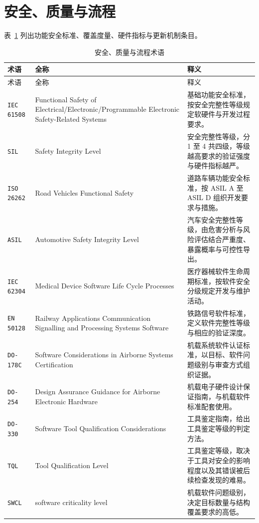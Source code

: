 \documentclass[12pt,a4paper,fontset=fandol]{ctexbook}
\newcommand{\Tp}[1]{\texttt{#1}}
\newcommand{\Bk}{\discretionary{}{}{}}
\begin{document}
\section{安全、质量与流程}

表~\ref{tab:apA-safety} 列出功能安全标准、覆盖度量、硬件指标与更新机制条目。

\begin{longtable}{@{} >{\raggedright\arraybackslash}p{} >{\raggedright\arraybackslash}p{} >{\raggedright\arraybackslash}p{}@{}}
\caption{安全、质量与流程术语}\label{tab:apA-safety} \\
\toprule
术语 & 全称 & 释义 \\
\midrule
\endfirsthead
\toprule
术语 & 全称 & 释义 \\
\midrule
\endhead
\bottomrule
\endfoot
\endlastfoot
\Tp{IEC 61508} & Functional Safety of Electrical/{\Bk}Electronic/{\Bk}Programmable Electronic Safety-Related Systems & 基础功能安全标准，按安全完整性等级规定软硬件与开发过程要求。 \\
\Tp{SIL} & Safety Integrity Level & 安全完整性等级，分 1 至 4 共四级，等级越高要求的验证强度与硬件指标越严。 \\
\Tp{ISO 26262} & Road Vehicles Functional Safety & 道路车辆功能安全标准，按 ASIL A 至 ASIL D 组织开发要求与措施。 \\
\Tp{ASIL} & Automotive Safety Integrity Level & 汽车安全完整性等级，由危害分析与风险评估结合严重度、暴露概率与可控性导出。 \\
\Tp{IEC 62304} & Medical Device Software Life Cycle Processes & 医疗器械软件生命周期标准，按软件安全分级规定开发与维护活动。 \\
\Tp{EN 50128} & Railway Applications Communication Signalling and Processing Systems Software & 铁路信号软件标准，定义软件完整性等级与相应的验证深度。 \\
\Tp{DO-178C} & Software Considerations in Airborne Systems Certification & 机载系统软件认证标准，以目标、软件问题级别与审查方式组织证据。 \\
\Tp{DO-254} & Design Assurance Guidance for Airborne Electronic Hardware & 机载电子硬件设计保证指南，与机载软件标准配套使用。 \\
\Tp{DO-330} & Software Tool Qualification Considerations & 工具鉴定指南，给出工具鉴定等级的判定方法。 \\
\Tp{TQL} & Tool Qualification Level & 工具鉴定等级，取决于工具对安全的影响程度以及其错误被后续检查发现的难易。 \\
\Tp{SWCL} & software criticality level & 机载软件问题级别，决定目标数量与结构覆盖要求的高低。 \\

\end{longtable}
\end{document}
